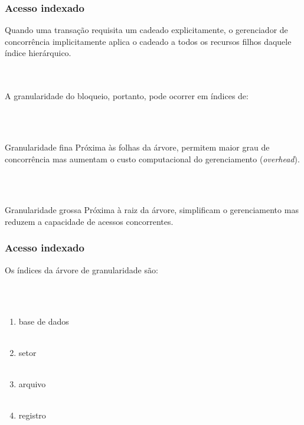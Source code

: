 \documentclass{beamer}
\begin{document}
\begin{frame}
    \frametitle{Acesso indexado}
    
    Quando uma transação requisita um cadeado explicitamente, o gerenciador de concorrência implicitamente aplica o cadeado a todos os recursos filhos daquele índice hierárquico.
    
    \\~\\
    A granularidade do bloqueio, portanto, pode ocorrer em índices de:
    
    \\~\\
    \begin{block}{Granularidade fina}
        Próxima às folhas da árvore, permitem maior grau de concorrência mas aumentam o custo computacional do gerenciamento (\emph{overhead}).
    \end{block}

    \\~\\
    \begin{block}{Granularidade grossa}
        Próxima à raiz da árvore, simplificam o gerenciamento mas reduzem a capacidade de acessos concorrentes.
    \end{block}
\end{frame}

\begin{frame}
    \frametitle{Acesso indexado}

    Os índices da árvore de granularidade são:

    \\~\\
    \begin{enumerate}
        \item base de dados \\~\\
        \item setor \\~\\
        \item arquivo \\~\\
        \item registro \\~\\
    \end{enumerate}
    
\end{frame}
    
\end{document}
